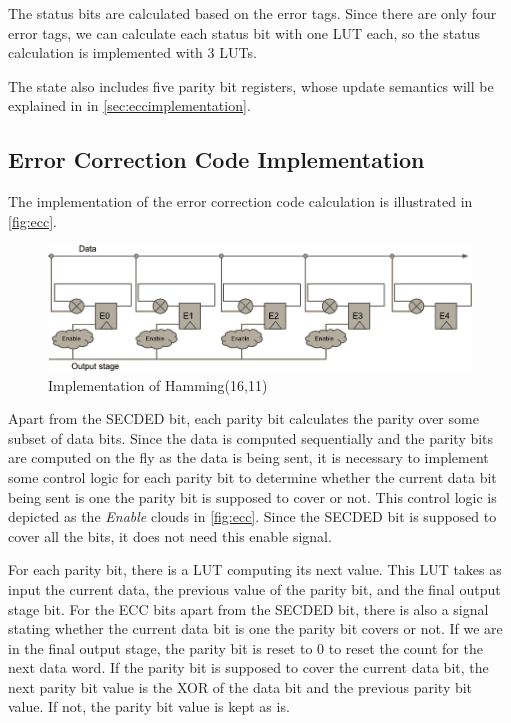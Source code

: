 The status bits are calculated based on the error tags. Since there
are only four error tags, we can calculate each status bit with one
LUT each, so the status calculation is implemented with 3 LUTs. 

The state also includes five parity bit registers, whose update
semantics will be explained in in \autoref{sec:eccimplementation}.

\subsection{Error Correction Code Implementation}
\label{sec:eccimplementation}
The implementation of the error correction code calculation is
illustrated in \autoref{fig:ecc}. 

\begin{figure}
\includegraphics[width=15cm]{implementation/fig_ecc}
\caption{Implementation of Hamming(16,11)}
\label{fig:ecc}
\end{figure}

Apart from the SECDED bit, each parity bit calculates the parity over
some subset of data bits. Since the data is computed sequentially and
the parity bits are computed on the fly as the data is being sent, it
is necessary to implement some control logic for each parity bit to
determine whether the current data bit being sent is one the parity
bit is supposed to cover or not. This control logic is depicted as the
\textit{Enable} clouds in \autoref{fig:ecc}. Since the SECDED bit is
supposed to cover all the bits, it does not need this enable signal. 

For each parity bit, there is a LUT computing its next value. This LUT
takes as input the current data, the previous value of the parity bit,
and the final output stage bit. For the ECC bits apart from the SECDED
bit, there is also a signal stating whether the current data bit is
one the parity bit covers or not. If we are in the final output stage,
the parity bit is reset to 0 to reset the count for the next data
word. If the parity bit is supposed to cover the current data bit, the
next parity bit value is the XOR of the data bit and the previous
parity bit value. If not, the parity bit value is kept as is. 

